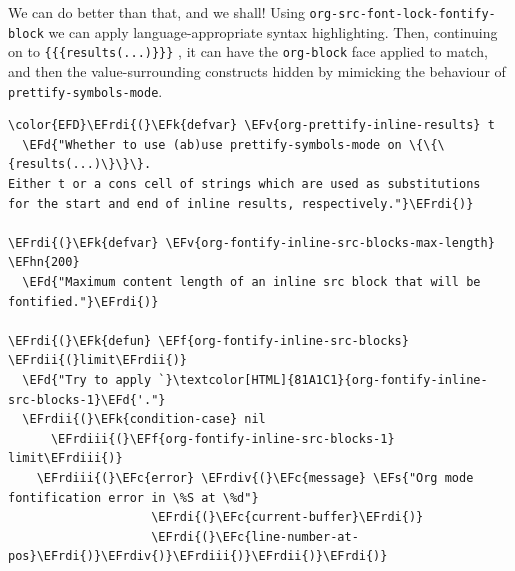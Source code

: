 \documentclass{scrartcl}
\newcommand{\EFk}[1]{\textcolor{EFk}{#1}} %
\newcommand{\EFd}[1]{\textcolor{EFd}{#1}} %
\newcommand{\EFs}[1]{\textcolor{EFs}{#1}} %
\newcommand{\EFc}[1]{\textcolor{EFc}{#1}} %
\newcommand{\EFv}[1]{\textcolor{EFv}{#1}} %
\newcommand{\EFf}[1]{\textcolor{EFf}{#1}} %
\newcommand{\EFhn}[1]{#1} %
\newcommand{\EFrdi}[1]{#1} %
\newcommand{\EFrdii}[1]{#1} %
\newcommand{\EFrdiii}[1]{#1} %
\newcommand{\EFrdiv}[1]{#1} %
\begin{document}
We can do better than that, and we shall! Using \texttt{org-src-font-lock-fontify-block}
we can apply language-appropriate syntax highlighting. Then, continuing on to
\texttt{\{\{\{results(...)\}\}\}} , it can have the \texttt{org-block} face applied to match, and then
the value-surrounding constructs hidden by mimicking the behaviour of
\texttt{prettify-symbols-mode}.

\begin{Code}
\begin{Verbatim}[]
\color{EFD}\EFrdi{(}\EFk{defvar} \EFv{org-prettify-inline-results} t
  \EFd{"Whether to use (ab)use prettify-symbols-mode on \{\{\{results(...)\}\}\}.
Either t or a cons cell of strings which are used as substitutions
for the start and end of inline results, respectively."}\EFrdi{)}

\EFrdi{(}\EFk{defvar} \EFv{org-fontify-inline-src-blocks-max-length} \EFhn{200}
  \EFd{"Maximum content length of an inline src block that will be fontified."}\EFrdi{)}

\EFrdi{(}\EFk{defun} \EFf{org-fontify-inline-src-blocks} \EFrdii{(}limit\EFrdii{)}
  \EFd{"Try to apply `}\textcolor[HTML]{81A1C1}{org-fontify-inline-src-blocks-1}\EFd{'."}
  \EFrdii{(}\EFk{condition-case} nil
      \EFrdiii{(}\EFf{org-fontify-inline-src-blocks-1} limit\EFrdiii{)}
    \EFrdiii{(}\EFc{error} \EFrdiv{(}\EFc{message} \EFs{"Org mode fontification error in \%S at \%d"}
                    \EFrdi{(}\EFc{current-buffer}\EFrdi{)}
                    \EFrdi{(}\EFc{line-number-at-pos}\EFrdi{)}\EFrdiv{)}\EFrdiii{)}\EFrdii{)}\EFrdi{)}


\end{Verbatim}
\end{Code}
\end{document}
